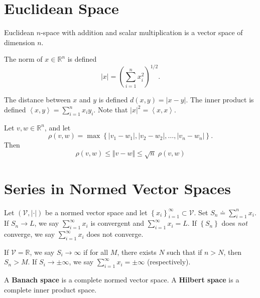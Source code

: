 \documentclass[10pt]{report}
\begin{document}

\section{Euclidean Space}

\begin{thrm}[]
	Euclidean $n$-space with addition and scalar multiplication is a vector space of dimension $n$.
\end{thrm}

The norm of $x \in \mathbb{R}^n$ is defined
\[
	|x| = \left( \sum_{i=1}^{n} x_i^2 \right)^{1/2}.
\] 

The distance between $x$ and $y$ is defined $d(x,y) = |x-y|$. The inner product is defined $\left\langle x,y \right\rangle = \sum_{i=1}^{n} x_i y_i$. Note that $|x|^2 = \left\langle x,x \right\rangle$.

\pagebreak

\begin{prop}
	Let $v,w \in \mathbb{R}^n$, and let
	\[
		\rho(v,w) = \max \left\{ |v_1-w_1|, |v_2-w_2|, \dots, |v_n-w_n| \right\}.
	\]
	Then
	 \[
		 \rho(v,w) \leq \Vert{v-w}\Vert \leq \sqrt{n} \; \rho(v,w)
	\] 
\end{prop}


\section{Series in Normed Vector Spaces}

Let $(\mathcal{V},|\cdot|)$ be a normed vector space and let $\left\{ x_i \right\}_{i=1}^\infty\subset \mathcal{V}$. Set $S_n \doteq \sum_{i=1}^{n} x_i$. If $S_n \to L$, we say $\sum_{i=1}^{\infty} x_i$ is convergent and $\sum_{i=1}^{\infty} x_i = L$. If $\left\{ S_n \right\}$ does \textit{not} converge, we say $\sum_{i=1}^{\infty} x_i$ does not converge.

If $\mathcal{V}=\mathbb{R}$, we say $S_i \to \infty$ if for all $M$, there exists $N$ such that if $n  >N$, then $S_n > M$. If $S_i \to \pm \infty$, we say $\sum_{i=1}^{\infty} x_i = \pm\infty$ (respectively).

\begin{defn}[]
A \textbf{Banach space} is a complete normed vector space. A \textbf{Hilbert space} is a complete inner product space.
\end{defn}
\end{document}
